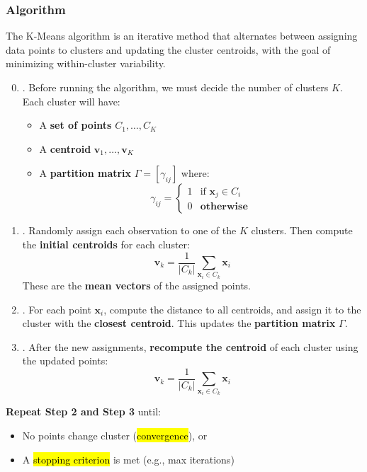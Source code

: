 \subsubsection{Algorithm}

The K-Means algorithm is an iterative method that alternates between assigning data points to clusters and updating the cluster centroids, with the goal of minimizing within-cluster variability.
\begin{enumerate}
    \setcounter{enumi}{-1}
    \item {}. Before running the algorithm, we must decide the number of clusters $K$. Each cluster will have:
    \begin{itemize}
        \item A \textbf{set of points} $C_{1}, \dots, C_{K}$
        \item A \textbf{centroid} $\mathbf{v}_{1}, \dots, \mathbf{v}_{K}$
        \item A \textbf{partition matrix} $\Gamma = \left[\gamma_{ij}\right]$ where:
        \begin{equation*}
            \gamma_{ij} = \begin{cases}
                1 & \text{if } \mathbf{x}_{j} \in C_{i} \\
                0 & \textbf{otherwise}
            \end{cases}
        \end{equation*}
    \end{itemize}


    \item {}. Randomly assign each observation to one of the $K$ clusters. Then compute the \textbf{initial centroids} for each cluster:
    \begin{equation*}
        \mathbf{v}_{k} = \dfrac{1}{\left|C_{k}\right|} \displaystyle\sum_{\mathbf{x}_{i} \in C_{k}} \mathbf{x}_{i}
    \end{equation*}
    These are the \textbf{mean vectors} of the assigned points.

    
    \item {}. For each point $\mathbf{x}_{i}$, compute the distance to all centroids, and assign it to the cluster with the \textbf{closest centroid}. This updates the \textbf{partition matrix} $\Gamma$.
    
    \item {}. After the new assignments, \textbf{recompute the centroid} of each cluster using the updated points:
    \begin{equation*}
        \mathbf{v}_{k} = \dfrac{1}{\left|C_{k}\right|} \displaystyle\sum_{\mathbf{x}_{i} \in C_{k}} \mathbf{x}_{i}
    \end{equation*}
\end{enumerate}
\textbf{Repeat Step 2 and Step 3} until:
\begin{itemize}[label=\textcolor{Green3}{}]
    \item No points change cluster (\hl{convergence}), or
    \item A \hl{stopping criterion} is met (e.g., max iterations)
\end{itemize}

